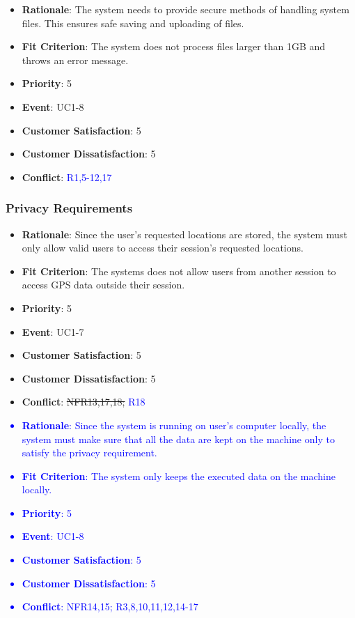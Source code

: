 \documentclass[12pt, titlepage]{article}
\newcounter{reqnum} %
\newcounter{freqnum} %
\begin{document}
\begin{itemize}
{\begin{itemize}
    \item \textbf{Rationale}: The system needs to provide secure methods of handling system files. This ensures
safe saving and uploading of files.
    \item \textbf{Fit Criterion}: The system does not process files larger than 1GB and throws an error message. 
    \item \textbf{Priority}: 5
    \item \textbf{Event}: UC1-8%
    \item \textbf{Customer Satisfaction}: 5
    \item \textbf{Customer Dissatisfaction}: 5
    \item \textbf{Conflict}: \textcolor{blue}{R1,5-12,17}
\end{itemize}
}

\subsubsection{Privacy Requirements}
\item[NFR\refstepcounter{freqnum}\thefreqnum
\label{NFR}:] 
\begin{itemize}
    \item \textbf{Rationale}: Since the user's requested locations are stored, the system must only allow valid users to access their session's requested locations.
    \item \textbf{Fit Criterion}: The systems does not allow users from another session to access GPS data outside their session.
    \item \textbf{Priority}: 5
    \item \textbf{Event}: UC1-7%
    \item \textbf{Customer Satisfaction}: 5
    \item \textbf{Customer Dissatisfaction}: 5
    \item \textbf{Conflict}: \sout{NFR13,17,18;} \textcolor{blue}{R18}
\end{itemize}

\textcolor{blue}{
\item[NFR\refstepcounter{freqnum}\thefreqnum
\label{NFR}:] 
\begin{itemize}
    \item \textbf{Rationale}: Since the system is running on user's computer locally, the system must make sure that all the data are kept on the machine only to satisfy the privacy requirement.
    \item \textbf{Fit Criterion}: The system only keeps the executed data on the machine locally.
    \item \textbf{Priority}: 5
    \item \textbf{Event}: UC1-8%
    \item \textbf{Customer Satisfaction}: 5
    \item \textbf{Customer Dissatisfaction}: 5
    \item \textbf{Conflict}: \textcolor{blue}{NFR14,15; R3,8,10,11,12,14-17}
\end{itemize}
}


\end{itemize}
\end{document}
